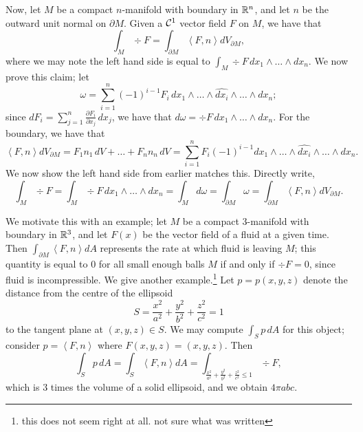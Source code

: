 Now, let $M$ be a compact $n$-manifold with boundary in $\mathbb R^n$, and let $n$ be the outward unit normal on $\partial M$. Given a $\mathcal C^1$ vector field $F$ on $M$, we have that
\[ \int_M \div F = \int_{\partial M} \left<F, n\right> dV_{\partial M}, \]
where we may note the left hand side is equal to $\int_M \div F \, dx_1 \wedge \dots \wedge dx_n$. We now prove this claim; let
\[ \omega = \sum_{i=1}^n (-1)^{i-1} F_i \, dx_1 \wedge \dots \wedge \widehat{dx_i} \wedge \dots \wedge dx_n; \]
since $dF_i = \sum_{j=1}^n \frac{\partial F_i}{\partial x_j} \, dx_j$, we have that $d\omega = \div F \, dx_1 \wedge \dots \wedge dx_n$. For the boundary, we have that
\[ \left<F, n\right> dV_{\partial M} = F_1 n_1 \, dV + \dots + F_n n_n \, dV = \sum_{i=1}^n F_i (-1)^{i-1} dx_1 \wedge \dots \wedge \widehat{dx_i} \wedge \dots \wedge dx_n. \]
We now show the left hand side from earlier matches this. Directly write,
\[ \int_M \div F = \int_M \div F \, dx_1 \wedge \dots \wedge dx_n = \int_M d\omega = \int_{\partial M} \omega = \int_{\partial M}\left<F, n\right> dV_{\partial M}. \]

\newpage
\noindent We motivate this with an example; let $M$ be a compact $3$-manifold with boundary in $\mathbb R^3$, and let $F(x)$ be the vector field of a fluid at a given time. Then $\int_{\partial M} \left<F, n\right> dA$ represents the rate at which fluid is leaving $M$; this quantity is equal to $0$ for all small enough balls $M$ if and only if $\div F = 0$, since fluid is incompressible.
\medskip\newline
We give another example.\footnote{this does not seem right at all. not sure what was written} Let $p = p(x, y, z)$ denote the distance from the centre of the ellipsoid
\[ S = \frac{x^2}{a^2} + \frac{y^2}{b^2} + \frac{z^2}{c^2} = 1 \]
to the tangent plane at $(x, y, z) \in S$. We may compute $\int_S p \, dA$ for this object; consider $p = \left<F, n\right>$ where $F(x, y, z) = (x, y, z)$. Then
\[ \int_S p \, dA = \int_S \left<F, n\right> dA = \int_{\frac{x^2}{a^2} + \frac{y^2}{b^2} + \frac{z^2}{c^2} \leq 1} \div F, \]
which is $3$ times the volume of a solid ellipsoid, and we obtain $4\pi abc$.